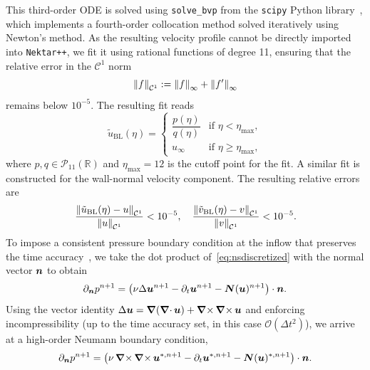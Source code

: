 \documentclass[../main.tex]{subfiles}
\begin{document}
This third-order ODE is solved using \texttt{solve\_bvp} from the \texttt{scipy} Python library~\cite{scipy}, which implements a fourth-order collocation method solved iteratively using Newton’s method. As the resulting velocity profile cannot be directly imported into \texttt{Nektar++}, we fit it using rational functions of degree 11, ensuring that the relative error in the $\mathcal{C}^1$ norm
\begin{equation}
	\left\|f\right\|_{\mathcal{C}^1} := \left\|f\right\|_\infty + \left\|f'\right\|_\infty
\end{equation}
remains below $10^{-5}$. The resulting fit reads 
\begin{equation}
	\tilde{u}_\text{BL}(\eta) =
	\begin{cases}
		\dfrac{p(\eta)}{q(\eta)} & \text{if } \eta < \eta_\text{max},    \\
		u_\infty                 & \text{if } \eta \geq \eta_\text{max},
	\end{cases}
\end{equation}
where $p, q \in \mathcal{P}_{11}(\mathbb{R})$ and $\eta_\text{max} = 12$ is the cutoff point for the fit. A similar fit is constructed for the wall-normal velocity component. The resulting relative errors are
\begin{equation}
	\frac{\left\|\tilde{u}_\text{BL}(\eta) - u\right\|_{\mathcal{C}^1}}{\left\|u\right\|_{\mathcal{C}^1}} < 10^{-5}, \quad
	\frac{\left\|\tilde{v}_\text{BL}(\eta) - v\right\|_{\mathcal{C}^1}}{\left\|v\right\|_{\mathcal{C}^1}} < 10^{-5}.
	\label{eq:blasiusfit}
\end{equation}
To impose a consistent pressure boundary condition at the inflow that preserves the time accuracy~\cite{nektardeveloperguide}, we take the dot product of~\eqref{eq:nsdiscretized} with the normal vector $\bm{n}$ to obtain
\begin{equation}
	\partial_{\bm{n}} p^{n+1} = \left( \nu \Delta \bm{u}^{n+1} - \partial_t \bm{u}^{n+1} - \bm{N}(\bm{u})^{n+1} \right) \cdot \bm{n}.
	\label{eq:blasiuspressurepre}
\end{equation}
Using the vector identity $\Delta \bm{u} = \grad(\operatorname{\bm{\nabla}\cdot} \bm{u}) + \operatorname{\bm{\nabla}\times} \operatorname{\bm{\nabla}\times} \bm{u}$ and enforcing incompressibility (up to the time accuracy set, in this case $\mathcal{O}(\Delta t^2)$), we arrive at a high-order Neumann boundary condition,
\begin{equation}
	\partial_{\bm{n}} p^{n+1} = \left( \nu \operatorname{\bm{\nabla}\times} \operatorname{\bm{\nabla}\times} \bm{u}^{*,n+1} - \partial_t \bm{u}^{*,n+1} - \bm{N}(\bm{u})^{*,n+1} \right) \cdot \bm{n}.
	\label{eq:pressureBC}
\end{equation}
\end{document}
